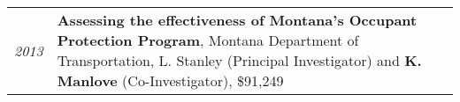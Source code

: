 \documentclass[9pt]{article}
\newenvironment{outerlist}[1][\enskip\textbullet]%
        {\begin{itemize}[#1]}{\end{itemize}%
         }
\newenvironment{innerlist}[1][\enskip\textbullet]%
        {\begin{compactitem}[#1]}{\end{compactitem}}
\begin{document}
\vspace{.15in}

		\vspace{.05in}

%		
\vspace{.15in}


\vspace{.15in}

\begin{tabular}{p{.5cm} p{15cm}}
\hspace{-1.75cm} \footnotesize{\textit{2013}} & \hspace{-.5cm}\textbf{Assessing the effectiveness of Montana's Occupant Protection Program}, Montana Department of Transportation, L. Stanley (Principal Investigator) and \textbf{K. Manlove} (Co-Investigator), \$91,249 \\
 
\end{tabular}
\vspace{.15in}

\vspace{.15in}
\end{document}
